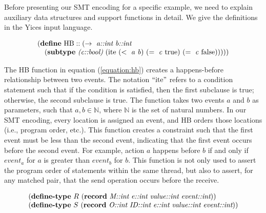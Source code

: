 Before presenting our SMT encoding for a specific example, we need to explain auxiliary data structures and support functions in detail. We give the definitions in the Yices \cite{dutertre:CAV06} input language.

\begin{equation}
\begin{array}{l}
(\textbf{define}\ \mathrm{HB}::(\rightarrow\ \emph{a::int}\ \emph{b::int}\\
\ \ \ (\textbf{subtype}\ \emph{(c::bool)}\ (\mathrm{ite}\ (<\ \mathit{a}\ \mathit{b})\ (=\ \mathit{c}\ \mathrm{true})\ (=\ \mathit{c}\ \mathrm{false})))))
\end{array}
\label{equation:hb}
\end{equation}


The HB function in equation (\ref{equation:hb}) creates a happens-before relationship between two events. The notation $``\mathrm{ite}"$ refers to a condition statement such that if the condition is satisfied, then the first subclause is true; otherwise, the second subclause is true. The function takes two events $a$ and $b$ as parameters, such that $a,b \in \mathbb{N}$, where $\mathbb{N}$ is the set of natural numbers. In our SMT encoding, every location is assigned an event, and HB orders those locations (i.e., program order, etc.). This function creates a constraint such that the first event must be less than the second event, indicating that the first event occurs before the second event. For example, action $a$ happens before $b$ if and only if $\mathit{event}_a$ for $a$ is greater than $\mathit{event}_b$ for $b$. This function is not only used to assert the program order of statements within the same thread, but also to assert, for any matched pair, that the send operation
occurs before the receive.

\begin{equation}
\begin{array}{l}
(\textbf{define-type}\ R\ (\textbf{record}\ \emph{M::int}\ \emph{e::int}\ \emph{value::int}\ \emph{event::int})) \\
(\textbf{define-type}\ S\ (\textbf{record}\ \emph{O::int}\ \emph{ID::int}\ \emph{e::int}\ \emph{value::int}\ \emph{event::int}))
\end{array}
\label{equation:record}
\end{equation}

